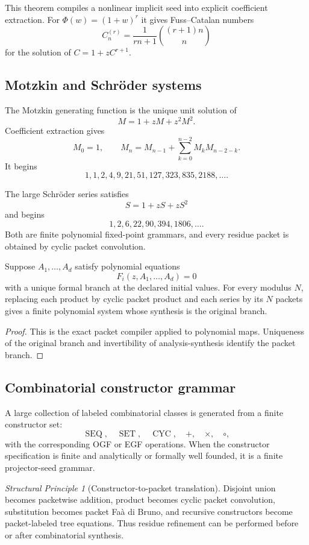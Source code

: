 \documentclass[11pt]{article}
\theoremstyle{definition}\newtheorem{definition}[theorem]{Definition}\newtheorem{example}[theorem]{Example}\newtheorem{construction}[theorem]{Construction}\newtheorem{algorithm}[theorem]{Algorithm}\newtheorem{conjecture}[theorem]{Conjecture}\newtheorem{problem}[theorem]{Problem}
\theoremstyle{remark}\newtheorem{remark}[theorem]{Remark}\newtheorem{boundary}[theorem]{Boundary}\newtheorem{certificate}[theorem]{Computational Certificate}\newtheorem{classical}[theorem]{Classical Input}\newtheorem{principle}[theorem]{Structural Principle}
\begin{document}
This theorem compiles a nonlinear implicit seed into explicit coefficient extraction.  For $\Phi(w)=(1+w)^r$ it gives Fuss--Catalan numbers
\[
 \boxed{C_n^{(r)}=\frac{1}{rn+1}\binom{(r+1)n}{n}}
\]
for the solution of $C=1+zC^{r+1}$.

\subsection{Motzkin and Schr\"oder systems}
The Motzkin generating function is the unique unit solution of
\[
 M=1+zM+z^2M^2.
\]
Coefficient extraction gives
\[
 M_0=1,\qquad
 M_n=M_{n-1}+\sum_{k=0}^{n-2}M_kM_{n-2-k}.
\]
It begins
\[
 1,1,2,4,9,21,51,127,323,835,2188,\ldots.
\]

The large Schr\"oder series satisfies
\[
 S=1+zS+zS^2
\]
and begins
\[
 1,2,6,22,90,394,1806,\ldots.
\]
Both are finite polynomial fixed-point grammars, and every residue packet is obtained by cyclic packet convolution.

\begin{proposition}
Suppose $A_1,\ldots,A_d$ satisfy polynomial equations
\[
 F_i(z,A_1,\ldots,A_d)=0
\]
with a unique formal branch at the declared initial values.  For every modulus $N$, replacing each product by cyclic packet product and each series by its $N$ packets gives a finite polynomial system whose synthesis is the original branch.
\end{proposition}
\begin{proof}
This is the exact packet compiler applied to polynomial maps.  Uniqueness of the original branch and invertibility of analysis-synthesis identify the packet branch.
\end{proof}

\subsection{Combinatorial constructor grammar}
A large collection of labeled combinatorial classes is generated from a finite constructor set:
\[
 \operatorname{SEQ},\quad \operatorname{SET},\quad \operatorname{CYC},\quad
 +,\quad\times,\quad\circ,
\]
with the corresponding OGF or EGF operations.  When the constructor specification is finite and analytically or formally well founded, it is a finite projector-seed grammar.

\begin{principle}[Constructor-to-packet translation]
Disjoint union becomes packetwise addition, product becomes cyclic packet convolution, substitution becomes packet Fa\`a di Bruno, and recursive constructors become packet-labeled tree equations.  Thus residue refinement can be performed before or after combinatorial synthesis.
\end{principle}
\end{document}
